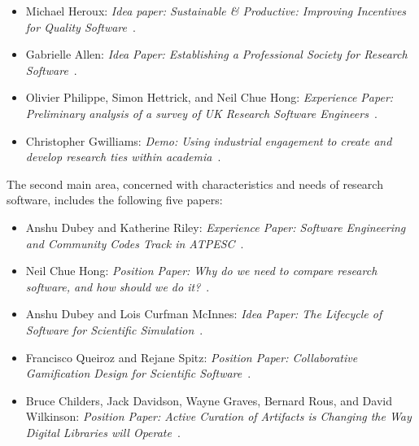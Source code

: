 \documentclass[11pt, oneside]{amsart}
\begin{document}
\begin{itemize}
\item Michael Heroux: \emph{Idea paper: Sustainable \& Productive:
Improving Incentives for Quality Software}~\cite{Heroux:2016ws}.

\item Gabrielle Allen: \emph{Idea Paper: Establishing a Professional
Society for Research Software}~\cite{GAllen:2016ws}.

\item Olivier Philippe\textsuperscript{\textasteriskcentered}, Simon Hettrick, and Neil Chue Hong:
\emph{Experience Paper: Preliminary analysis of a survey of UK Research
Software Engineers}~\cite{Philippe:2016ws}.

\item Christopher Gwilliams: \emph{Demo: Using industrial engagement to
create and develop research ties within academia}~\cite{Gwilliams:2016ws}.

\end{itemize}

\noindent The second main area, concerned with characteristics and needs of research software, includes the following five papers:

\begin{itemize}

\item Anshu Dubey\textsuperscript{\textasteriskcentered} and Katherine Riley: \emph{Experience Paper: Software
Engineering and Community Codes Track in ATPESC}~\cite{Dubey1:2016ws}.

\item Neil Chue Hong: \emph{Position Paper: Why do we need to compare
research software, and how should we do it?}~\cite{ChueHong:2016ws}.

\item Anshu Dubey\textsuperscript{\textasteriskcentered} and Lois Curfman McInnes: \emph{Idea Paper: The Lifecycle
of Software for Scientific Simulation}~\cite{Dubey2:2016ws}.

\item Francisco Queiroz\textsuperscript{\textasteriskcentered} and Rejane Spitz: \emph{Position Paper:
Collaborative Gamification Design for Scientific Software}~\cite{Queiroz:2016ws}.

\item Bruce Childers\textsuperscript{\textasteriskcentered}, Jack Davidson, Wayne Graves, Bernard Rous, and
David Wilkinson: \emph{Position Paper: Active Curation of Artifacts is Changing
the Way Digital Libraries will Operate}~\cite{Childers:2016ws}.

\end{itemize}
\end{document}

